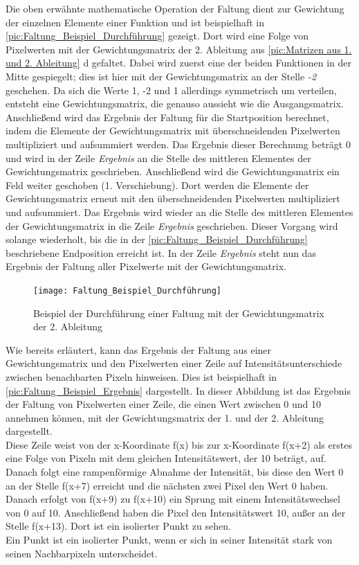 \documentclass[ngerman,12pt]{article} %
\begin{document}
Die oben erwähnte mathematische Operation der Faltung dient zur Gewichtung der einzelnen Elemente einer Funktion und ist beispielhaft in \autoref{pic:Faltung_Beispiel_Durchführung} gezeigt. Dort wird eine Folge von Pixelwerten mit der Gewichtungsmatrix der 2. Ableitung aus \autoref{pic:Matrizen aus 1. und 2. Ableitung} d gefaltet. Dabei wird zuerst eine der beiden Funktionen in der Mitte gespiegelt; dies ist hier mit der Gewichtungsmatrix an der Stelle \textit{-2} geschehen. Da sich die Werte 1, -2 und 1 allerdings symmetrisch um verteilen, entsteht eine Gewichtungsmatrix, die genauso aussieht wie die Ausgangsmatrix. Anschließend wird das Ergebnis der Faltung für die Startposition berechnet, indem die Elemente der Gewichtungsmatrix mit überschneidenden Pixelwerten multipliziert und aufsummiert werden. Das Ergebnis dieser Berechnung beträgt 0 und wird in der Zeile \textit{Ergebnis} an die Stelle des mittleren Elementes der Gewichtungsmatrix geschrieben. Anschließend wird die Gewichtungsmatrix ein Feld weiter geschoben (1. Verschiebung). Dort werden die Elemente der Gewichtungsmatrix erneut mit den überschneidenden Pixelwerten multipliziert und aufsummiert. Das Ergebnis wird wieder an die Stelle des mittleren Elementes der Gewichtungsmatrix in die Zeile \textit{Ergebnis} geschrieben. Dieser Vorgang wird solange wiederholt, bis die in der \autoref{pic:Faltung_Beispiel_Durchführung} beschriebene Endposition erreicht ist. In der Zeile \textit{Ergebnis} steht nun das Ergebnis der Faltung aller Pixelwerte mit der Gewichtungsmatrix.\newline

\begin{figure} [h!tb]
	\begin{center}
	\texttt{[image: Faltung\_Beispiel\_Durchführung]}
	\caption[Durchführung einer Faltung]{\label{pic:Faltung_Beispiel_Durchführung}Beispiel der Durchführung einer Faltung mit der Gewichtungsmatrix der 2. Ableitung}
	\end{center}
\end{figure}

Wie bereits erläutert, kann das Ergebnis der Faltung aus einer Gewichtungsmatrix und den Pixelwerten einer Zeile auf Intensitätsunterschiede zwischen benachbarten Pixeln hinweisen. Dies ist beispielhaft in \autoref{pic:Faltung_Beispiel_Ergebnis} dargestellt. In dieser Abbildung ist das Ergebnis der Faltung von Pixelwerten einer Zeile, die einen Wert zwischen 0 und 10 annehmen können, mit der Gewichtungsmatrix der 1. und der 2. Ableitung dargestellt.\\
Diese Zeile weist von der x-Koordinate f(x) bis zur x-Koordinate f(x+2) als erstes eine Folge von Pixeln mit dem gleichen Intensitätswert, der 10 beträgt, auf. Danach folgt eine rampenförmige Abnahme der Intensität, bis diese den Wert 0 an der Stelle f(x+7) erreicht und die nächsten zwei Pixel den Wert 0 haben. Danach erfolgt von f(x+9) zu f(x+10) ein Sprung mit einem Intensitätswechsel von 0 auf 10. Anschließend haben die Pixel den Intensitätswert 10, außer an der Stelle f(x+13). Dort ist ein isolierter Punkt zu sehen.\\
Ein Punkt ist ein isolierter Punkt, wenn er sich in seiner Intensität stark von seinen Nachbarpixeln unterscheidet.\\
\end{document}

